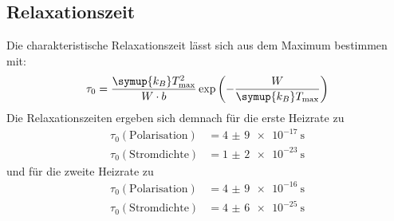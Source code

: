 \subsection{Relaxationszeit}
\label{sec:88}
Die charakteristische Relaxationszeit lässt sich aus dem Maximum bestimmen mit:
\begin{equation}
  \tau_\mathrm{0}=\dfrac{\symup{k_B}T_\mathrm{max}^2}{W \cdot b} \exp\left(-\dfrac{W}{\symup{k_B}T_\mathrm{max}} \right)
\end{equation}
Die Relaxationszeiten ergeben sich demnach für die erste Heizrate zu
\begin{align*}
  \tau_\mathrm{0}(\mathrm{Polarisation})&= \SI{4(9)e-17}{\second} \\
  \tau_\mathrm{0}(\mathrm{Stromdichte})&= \SI{1(2)e-23}{\second}
\end{align*}
und für die zweite Heizrate zu
\begin{align*}
  \tau_\mathrm{0}(\mathrm{Polarisation})&= \SI{4(9)e-16}{\second} \\
  \tau_\mathrm{0}(\mathrm{Stromdichte})&= \SI{4(6)e-25}{\second}
\end{align*}
